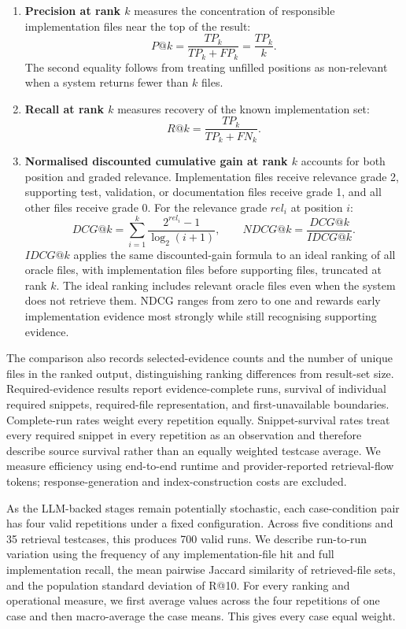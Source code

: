 \begin{enumerate}
\item \textbf{Precision at rank $k$} measures the concentration of responsible implementation files near the top of the result:
\[
P@k = \frac{TP_k}{TP_k + FP_k} = \frac{TP_k}{k}.
\]
The second equality follows from treating unfilled positions as non-relevant when a system returns fewer than $k$ files.

\item \textbf{Recall at rank $k$} measures recovery of the known implementation set:
\[
R@k = \frac{TP_k}{TP_k + FN_k}.
\]
\item \textbf{Normalised discounted cumulative gain at rank $k$} accounts for both position and graded relevance. Implementation files receive relevance grade 2, supporting test, validation, or documentation files receive grade 1, and all other files receive grade 0. For the relevance grade $rel_i$ at position $i$:
\[
DCG@k = \sum_{i=1}^{k} \frac{2^{rel_i}-1}{\log_2(i+1)},
\qquad
NDCG@k = \frac{DCG@k}{IDCG@k}.
\]
$IDCG@k$ applies the same discounted-gain formula to an ideal ranking of all oracle files, with implementation files before supporting files, truncated at rank $k$. The ideal ranking includes relevant oracle files even when the system does not retrieve them. NDCG ranges from zero to one and rewards early implementation evidence most strongly while still recognising supporting evidence.

\end{enumerate}

The comparison also records selected-evidence counts and the number of unique files in the ranked output, distinguishing ranking differences from result-set size. Required-evidence results report evidence-complete runs, survival of individual required snippets, required-file representation, and first-unavailable boundaries. Complete-run rates weight every repetition equally. Snippet-survival rates treat every required snippet in every repetition as an observation and therefore describe source survival rather than an equally weighted testcase average. We measure efficiency using end-to-end runtime and provider-reported retrieval-flow tokens; response-generation and index-construction costs are excluded.

As the LLM-backed stages remain potentially stochastic, each case-condition pair has four valid repetitions under a fixed configuration. Across five conditions and 35 retrieval testcases, this produces 700 valid runs. We describe run-to-run variation using the frequency of any implementation-file hit and full implementation recall, the mean pairwise Jaccard similarity of retrieved-file sets, and the population standard deviation of R@10. For every ranking and operational measure, we first average values across the four repetitions of one case and then macro-average the case means. This gives every case equal weight.

